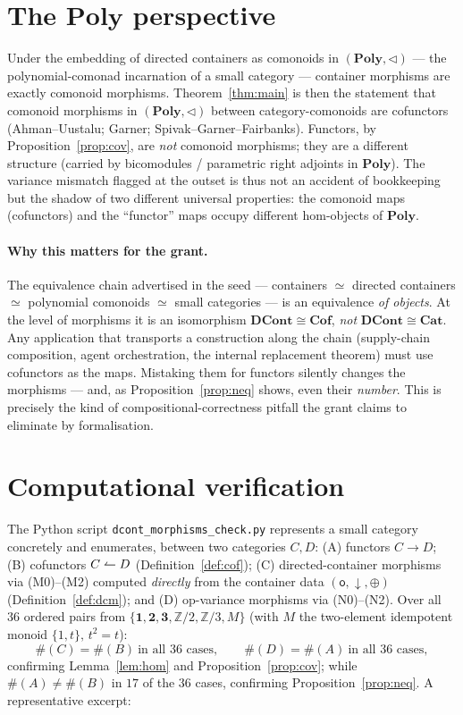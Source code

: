 \documentclass[11pt,a4paper]{article}
\newcommand{\Cat}{\mathbf{Cat}}
\newcommand{\Cof}{\mathbf{Cof}}
\newcommand{\DCont}{\mathbf{DCont}}
\newcommand{\co}{\mathrel{\text{\reflectbox{$\rightharpoonup$}}}}
\theoremstyle{definition}\newtheorem{definition}{Definition}[section]
\theoremstyle{plain}\newtheorem{proposition}[definition]{Proposition}
\theoremstyle{remark}\newtheorem{example}[definition]{Example}
\begin{document}
\section{The \texorpdfstring{$\mathbf{Poly}$}{Poly} perspective}\label{sec:poly}

Under the embedding of directed containers as comonoids in
$(\mathbf{Poly},\triangleleft)$ --- the polynomial-comonad incarnation of a
small category --- container morphisms are exactly comonoid morphisms.
Theorem~\ref{thm:main} is then the statement that comonoid morphisms in
$(\mathbf{Poly},\triangleleft)$ between category-comonoids are cofunctors
(Ahman--Uustalu; Garner; Spivak--Garner--Fairbanks). Functors, by
Proposition~\ref{prop:cov}, are \emph{not} comonoid morphisms; they are a
different structure (carried by bicomodules / parametric right adjoints in
$\mathbf{Poly}$). The variance mismatch flagged at the outset is thus not an
accident of bookkeeping but the shadow of two different universal properties:
the comonoid maps (cofunctors) and the ``functor'' maps occupy different
hom-objects of $\mathbf{Poly}$.

\paragraph{Why this matters for the grant.} The equivalence chain advertised in
the seed --- containers $\simeq$ directed containers $\simeq$ polynomial
comonoids $\simeq$ small categories --- is an equivalence \emph{of objects}.
At the level of morphisms it is an isomorphism $\DCont\cong\Cof$, \emph{not}
$\DCont\cong\Cat$. Any application that transports a construction along the
chain (supply-chain composition, agent orchestration, the internal replacement
theorem) must use cofunctors as the maps. Mistaking them for functors silently
changes the morphisms --- and, as Proposition~\ref{prop:neq} shows, even their
\emph{number}. This is precisely the kind of compositional-correctness pitfall
the grant claims to eliminate by formalisation.

\section{Computational verification}

The Python script \texttt{dcont\_morphisms\_check.py} represents a small
category concretely and enumerates, between two categories $C,D$: (A) functors
$C\to D$; (B) cofunctors $C\co D$ (Definition~\ref{def:cof}); (C)
directed-container morphisms via (M0)--(M2) computed \emph{directly} from the
container data $(\mathsf o,\downarrow,\oplus)$ (Definition~\ref{def:dcm}); and
(D) op-variance morphisms via (N0)--(N2). Over all $36$ ordered pairs from
$\{\mathbf1,\mathbf2,\mathbf3,\mathbb Z/2,\mathbb Z/3,M\}$ (with $M$ the
two-element idempotent monoid $\{1,t\},\,t^2=t$):
\[
  \#(C)=\#(B)\ \text{in all }36\text{ cases},\qquad
  \#(D)=\#(A)\ \text{in all }36\text{ cases},
\]
confirming Lemma~\ref{lem:hom} and Proposition~\ref{prop:cov}; while
$\#(A)\neq\#(B)$ in $17$ of the $36$ cases, confirming
Proposition~\ref{prop:neq}. A representative excerpt:
\end{document}
